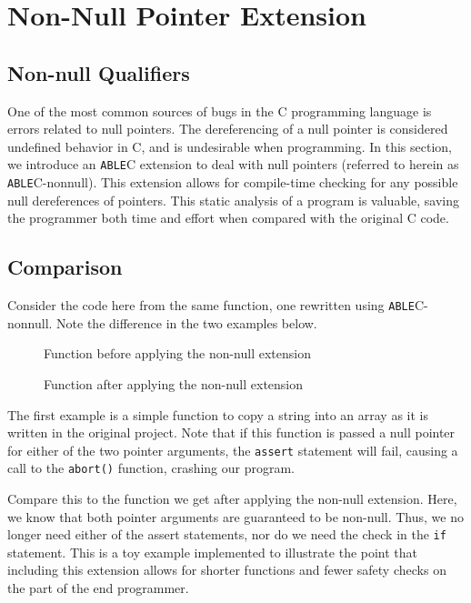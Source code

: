 \documentclass[main.tex]{subfiles}
\begin{document}
\section{Non-Null Pointer Extension}

\subsection{Non-null Qualifiers}
One of the most common sources of bugs in the C programming language is errors
related to null pointers. The dereferencing of a null pointer is considered
undefined behavior in C, and is undesirable when programming. In this section, we introduce an \verb|ABLE|C extension to
deal with null pointers (referred to herein as \verb|ABLE|C-nonnull). This extension allows for compile-time
checking for any possible null dereferences of pointers. This static analysis of a program is valuable, saving
the programmer both time and effort when compared with the original C code. 

\subsection{Comparison}

Consider the code here from the same function, one rewritten using \verb|ABLE|C-nonnull. Note the difference
in the two examples below. 

\begin{figure}[h]

\caption{Function before applying the non-null extension}
\end{figure}
\begin{figure}[h]

\caption{Function after applying the non-null extension}
\end{figure}

The first example is a simple function to copy a string into an array as it is written in the original project. Note that if 
this function is passed a null pointer for either of the two pointer arguments, the \verb|assert| statement will fail, causing a call to the \verb|abort()| function, crashing our program.

Compare this to the function we get after applying the non-null extension. Here, we know that both pointer arguments
are guaranteed to be non-null. Thus, we no longer need either of the assert statements, nor do we need the check in the
\verb|if| statement. This is a toy example implemented to illustrate the point that including this extension allows for shorter functions and fewer safety checks on the part of the end programmer.
\end{document}
